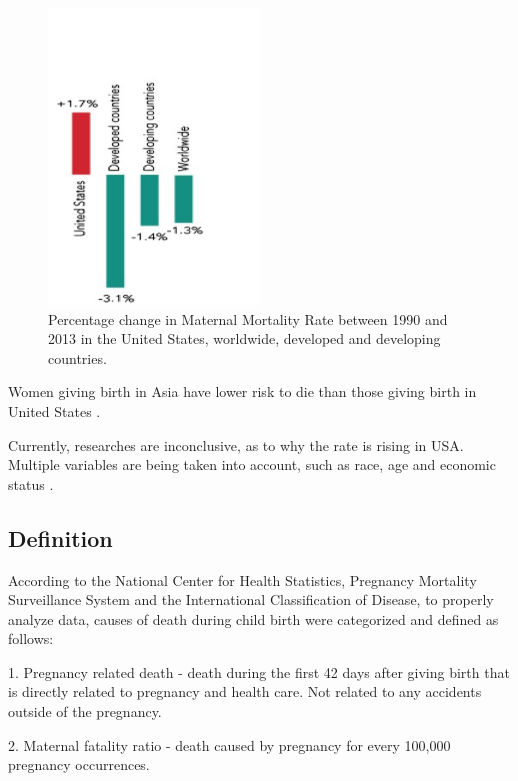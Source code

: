 \documentclass[sigconf]{acmart}
\begin{document}
\begin{figure}
  \centering
  \includegraphics[width=0.5\textwidth]{images/figure2.pdf}
  \caption{Percentage change in Maternal Mortality Rate between 1990 and 2013 in the United States, worldwide, developed and developing countries.} \label{fig:figure2} 
\end{figure}

Women giving birth in Asia have lower risk to die than those giving birth in United States \cite{world2012trends}.

Currently, researches are inconclusive, as to why the rate is rising in USA. Multiple variables are being taken into account, such as race, age and economic status \cite{creanga2012race}.

\subsection{Definition}

According to the National Center for Health Statistics, Pregnancy Mortality Surveillance System and the International Classification of Disease, to properly analyze data, causes of death during child birth were categorized and defined \cite{callaghan2012overview} as follows:


1. Pregnancy related death - death during the first 42 days after giving birth that is directly related to pregnancy and health care. Not related to any accidents outside of the pregnancy.
   


2. Maternal fatality ratio - death caused by pregnancy for every 100,000 pregnancy occurrences.
\end{document}

